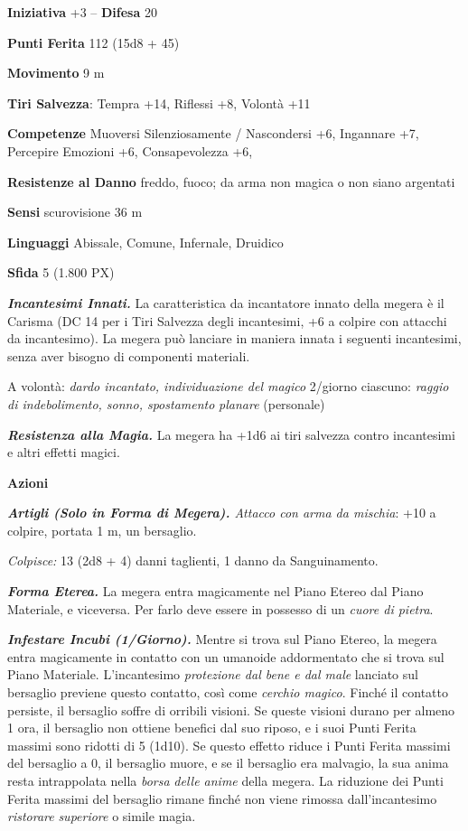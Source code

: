 \begin{multicols}{2}
\textbf{Iniziativa} +3 -- \textbf{Difesa} 20

\textbf{Punti Ferita} 112 (15d8 + 45)

\textbf{Movimento} 9 m

\textbf{Tiri Salvezza}: Tempra +14, Riflessi +8, Volontà +11

\textbf{Competenze} Muoversi Silenziosamente / Nascondersi +6, Ingannare +7, Percepire Emozioni +6, Consapevolezza +6,

\textbf{Resistenze al Danno} freddo, fuoco; da arma non magica o non siano argentati

\textbf{Sensi} scurovisione 36 m

\textbf{Linguaggi} Abissale, Comune, Infernale, Druidico

\textbf{Sfida} 5 (1.800 PX)

\textit{\textbf{Incantesimi Innati.}} La caratteristica da incantatore innato della megera è il Carisma (DC 14 per i Tiri Salvezza degli incantesimi, +6 a colpire con attacchi da incantesimo). La megera può lanciare in maniera innata i seguenti incantesimi, senza aver bisogno di
componenti materiali.

A volontà: \textit{dardo incantato, individuazione del magico} 2/giorno ciascuno: \textit{raggio di indebolimento, sonno, spostamento} \textit{planare} (personale)

\textit{\textbf{Resistenza alla Magia.}} La megera ha +1d6 ai tiri salvezza contro incantesimi e altri effetti magici.

\textbf{Azioni}

\textit{\textbf{Artigli (Solo in Forma di Megera).} Attacco con arma da mischia}: +10 a colpire, portata 1 m, un bersaglio.

\textit{Colpisce:} 13 (2d8 + 4) danni taglienti, 1 danno da Sanguinamento.

\textit{\textbf{Forma Eterea.}} La megera entra magicamente nel Piano Etereo dal Piano Materiale, e viceversa. Per farlo deve essere in possesso di un \textit{cuore di pietra}.

\textit{\textbf{Infestare Incubi (1/Giorno).}} Mentre si trova sul Piano Etereo, la megera entra magicamente in contatto con un umanoide addormentato che si trova sul Piano Materiale. L'incantesimo \textit{protezione dal bene e dal male} lanciato sul bersaglio previene questo contatto, così come \textit{cerchio magico}. Finché il contatto persiste, il bersaglio soffre di orribili visioni. Se queste visioni durano per almeno 1 ora, il bersaglio non ottiene benefici dal suo riposo, e i suoi Punti Ferita massimi sono ridotti di 5 (1d10). Se questo effetto riduce i Punti Ferita massimi del bersaglio a 0, il bersaglio muore, e se il bersaglio era malvagio, la sua anima resta intrappolata nella \textit{borsa} \textit{delle anime} della megera. La riduzione dei Punti Ferita massimi del bersaglio rimane finché non viene rimossa dall'incantesimo \textit{ristorare} \textit{superiore} o simile magia.


\end{multicols}

